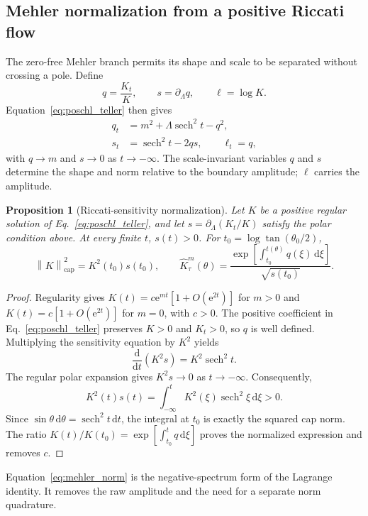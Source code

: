 ﻿\documentclass[11pt,a4paper]{article}
\newcommand{\dd}{\mathrm{d}}
\newcommand{\ee}{\mathrm{e}}
\newcommand{\sech}{\operatorname{sech}}
\newcommand{\norm}[1]{\left\lVert#1\right\rVert}
\newtheorem{proposition}{Proposition}
\begin{document}
\subsection{Mehler normalization from a positive Riccati flow}
\label{sec:mehler_algorithm}

The zero-free Mehler branch permits its shape and scale to be separated without crossing a pole. Define
\begin{equation}
 q=\frac{K_t}{K},\qquad s=\partial_\Lambda q,
 \qquad \ell=\log K.
\end{equation}
Equation~\eqref{eq:poschl_teller} then gives
\begin{align}
 q_t&=m^2+\Lambda\sech^2t-q^2,\\
 s_t&=\sech^2t-2qs,
 \qquad \ell_t=q,
 \label{eq:mehler_riccati}
\end{align}
with $q\to m$ and $s\to0$ as $t\to-\infty$. The scale-invariant variables $q$ and $s$ determine the shape and norm relative to the boundary amplitude; $\ell$ carries the amplitude.

\begin{proposition}[Riccati-sensitivity normalization]
\label{prop:mehler_norm}
Let $K$ be a positive regular solution of Eq.~\eqref{eq:poschl_teller}, and let $s=\partial_\Lambda(K_t/K)$ satisfy the polar condition above. At every finite $t$, $s(t)>0$. For $t_0=\log\tan(\theta_0/2)$,
\begin{equation}
 \norm{K}_{\mathrm{cap}}^2=K^2(t_0)s(t_0),
 \qquad
 \widehat K_\tau^m(\theta)=
 \frac{\exp\!\left[\int_{t_0}^{t(\theta)}q(\xi)\,\dd\xi\right]}
 {\sqrt{s(t_0)}}.
 \label{eq:mehler_norm}
\end{equation}
\end{proposition}
\begin{proof}
Regularity gives $K(t)=c\ee^{mt}[1+O(\ee^{2t})]$ for $m>0$ and $K(t)=c[1+O(\ee^{2t})]$ for $m=0$, with $c>0$. The positive coefficient in Eq.~\eqref{eq:poschl_teller} preserves $K>0$ and $K_t>0$, so $q$ is well defined. Multiplying the sensitivity equation by $K^2$ yields
\begin{equation}
 \frac{\dd}{\dd t}(K^2s)=K^2\sech^2t.
 \label{eq:mehler_integrating_factor}
\end{equation}
The regular polar expansion gives $K^2s\to0$ as $t\to-\infty$. Consequently,
\begin{equation}
 K^2(t)s(t)=\int_{-\infty}^{t}K^2(\xi)\sech^2\xi\,\dd\xi>0.
\end{equation}
Since $\sin\theta\,\dd\theta=\sech^2t\,\dd t$, the integral at $t_0$ is exactly the squared cap norm. The ratio $K(t)/K(t_0)=\exp[\int_{t_0}^{t}q\,\dd\xi]$ proves the normalized expression and removes $c$.
\end{proof}
Equation~\eqref{eq:mehler_norm} is the negative-spectrum form of the Lagrange identity. It removes the raw amplitude and the need for a separate norm quadrature.
\end{document}
